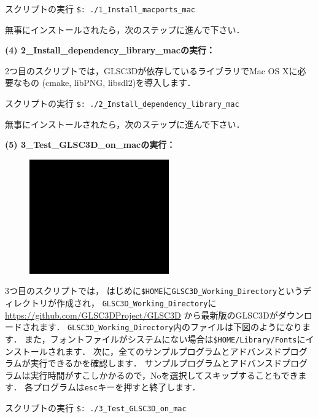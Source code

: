 \documentclass[platex,a4paper,12pt]{jsarticle}%
\begin{document}
\begin{itembox}[l]{スクリプトの実行}
\verb|$: ./1_Install_macports_mac|
\end{itembox}

無事にインストールされたら，次のステップに進んで下さい．

\noindent 
{\bf (4) 2\_Install\_dependency\_library\_macの実行：} 

2つ目のスクリプトでは，GLSC3Dが依存しているライブラリでMac OS Xに必要なもの
(cmake, libPNG, libsdl2)を導入します．

\begin{itembox}[l]{スクリプトの実行}
\verb|$: ./2_Install_dependency_library_mac|
\end{itembox}

無事にインストールされたら，次のステップに進んで下さい．

\noindent 
{\bf (5) 3\_Test\_GLSC3D\_on\_macの実行：} 

\begin{figure}
\includegraphics[width=60mm]{Canvas_Directory_GLSC3D.eps}
\end{figure}

3つ目のスクリプトでは，
はじめに\verb|$HOME|に\verb|GLSC3D_Working_Directory|というディレクトリが作成され，
\verb|GLSC3D_Working_Directory|に
\url{https://github.com/GLSC3DProject/GLSC3D}
から最新版のGLSC3Dがダウンロードされます．
\verb|GLSC3D_Working_Directory|内のファイルは下図のようになります．
また，フォントファイルがシステムにない場合は\verb|$HOME/Library/Fonts|にインストールされます．
次に，全てのサンプルプログラムとアドバンスドプログラムが実行できるかを確認します．
サンプルプログラムとアドバンスドプログラムは実行時間がすこしかかるので，Noを選択してスキップすることもできます．
各プログラムは\verb|esc|キーを押すと終了します．

\begin{itembox}[l]{スクリプトの実行}
\verb|$: ./3_Test_GLSC3D_on_mac|
\end{itembox}
\end{document}
